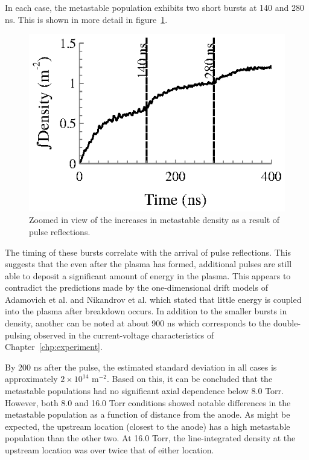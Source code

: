 In each case, the metastable population exhibits two short bursts at 140 and 280
ns. This is shown in more detail in figure~\ref{fig:mzoomed}.
\begin{figure}
  \centering
  \includegraphics{./chapters/metastables/figures/mzoomed.eps}
  \caption{Zoomed in view of the increases in metastable density as a result of
    pulse reflections.}
  \label{fig:mzoomed}
\end{figure}
The timing of these bursts correlate with the arrival of pulse reflections.
This suggests that the even after the plasma has formed, additional pulses are
still able to deposit a significant amount of energy in the plasma. This appears
to contradict the predictions made by the one-dimensional drift models of
Adamovich et al. \cite{Adamovich2009} and Nikandrov et al. \cite{Nikandrov2008}
which stated that little energy is coupled into the plasma after breakdown
occurs. In addition to the smaller bursts in density, another can be noted at
about 900 ns which corresponds to the double-pulsing observed in the
current-voltage characteristics of Chapter~\ref{chp:experiment}.

By 200 ns after the pulse, the estimated standard deviation in all cases is
approximately $2\times10^{14}$ m$^{-2}$. Based on this, it can be concluded that
the metastable populations had no significant axial dependence below 8.0 Torr.
However, both 8.0 and 16.0 Torr conditions showed notable differences in the
metastable population as a function of distance from the anode. As might be
expected, the upstream location (closest to the anode) has a high metastable
population than the other two. At 16.0 Torr, the line-integrated density at the
upstream location was over twice that of either location.

